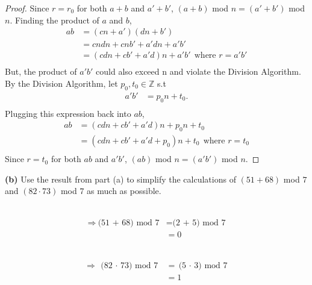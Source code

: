 \documentclass[12pt, letterpaper]{article}
\begin{document}
\begin{proof}
    Since $r=r_{0}$ for both $a+b$ and $a' + b'$, $(a+b)$ mod $n = (a' + b')$ mod $n$. Finding the product of $a$ and $b$,
    \begin{align*}
        ab &= (cn + a')(dn + b') \\
        &= cndn +cnb' +a'dn + a'b'\\
        &= (cdn + cb' +a'd)n + a'b' \ \ \text{where $r = a'b'$}\\ 
    \end{align*}
    But, the product of $a'b'$ could also exceed n and violate the Division Algorithm. By the Division Algorithm, let $p_{0}, t_{0} \in \mathbb{Z}$ s.t
    \begin{align*}
        a'b' &= p_{0}n + t_{0}. \\
    \end{align*}
    Plugging this expression back into $ab$,
    \begin{align*}
        ab &= (cdn + cb' +a'd)n + p_{0}n + t_{0} \\ 
        &= (cdn + cb' +a'd + p_{0})n + t_{0} \ \ \text{where $r = t_{0}$}\\
    \end{align*}
    Since $r = t_{0}$ for both $ab$ and $a'b'$, $(ab)$ mod $n = (a'b')$ mod $n$.
\end{proof}

\textbf{(b)} Use the result from part (a) to simplify the calculations of $(51 + 68)$ mod $7$ and $(82 \cdot 73)$ mod $7$ as much as possible.
\begin{center}
     \ \ \  \ \  \ \  \\
    \begin{align*}
    \Rightarrow \ \text{(51 + 68) mod 7} &= \text{(2 + 5) mod 7} \\
    &= \boxed{0}
\end{align*} 
\end{center}

\begin{center}
     \ \ \  \ \  \ \  \\
    \begin{align*}
        \Rightarrow \ \text{(82 $\cdot$ 73) mod 7} &= \text{(5 $\cdot$ 3) mod 7} \\
        &= \boxed{1}
    \end{align*}
\end{center}
\end{document}
